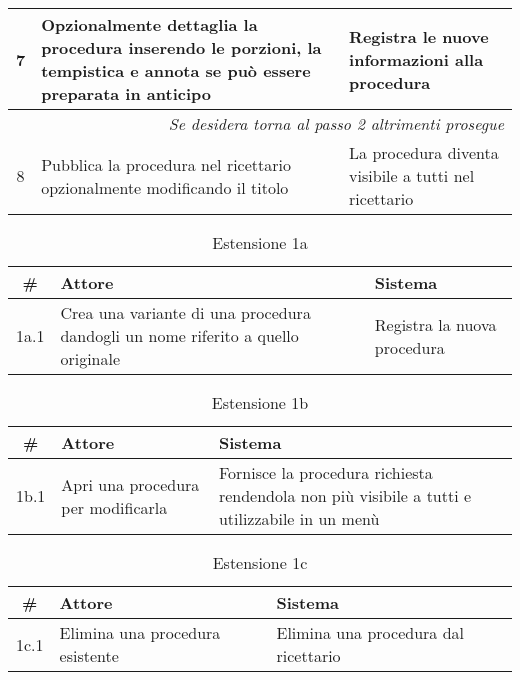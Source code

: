 \begin{tabular}{|c|p{7cm}|p{6.5cm}|}
      7                  & Opzionalmente dettaglia la procedura inserendo le porzioni, la tempistica e annota se può essere preparata in anticipo           & Registra le nuove informazioni alla procedura             \\\hline
      \multicolumn{3}{|r|}{\textit{Se desidera torna al passo 2 altrimenti prosegue}}                                                                                                                                   \\\hline
      8                  & Pubblica la procedura nel ricettario opzionalmente modificando il titolo                                                         & La procedura diventa visibile a tutti nel ricettario      \\\hline
\end{tabular}

\begin{table}[H]\caption*{Estensione 1a}
      \small
      \begin{tabular}{|c|p{7cm}|p{6.23cm}|}
            \hline\bfseries \# & \bfseries Attore                                                                & \bfseries Sistema           \\\hline
            1a.1               & Crea una variante di una procedura dandogli un nome riferito a quello originale & Registra la nuova procedura \\\hline
      \end{tabular}
\end{table}

\begin{table}[H]\caption*{Estensione 1b}
      \small
      \begin{tabular}{|c|p{7cm}|p{6.23cm}|}
            \hline\bfseries \# & \bfseries Attore                   & \bfseries Sistema                                                                             \\\hline
            1b.1               & Apri una procedura per modificarla & Fornisce la procedura richiesta rendendola non più visibile a tutti e utilizzabile in un menù \\\hline
      \end{tabular}
\end{table}

\begin{table}[H]\caption*{Estensione 1c}
      \small
      \begin{tabular}{|c|p{7cm}|p{6.24cm}|}
            \hline\bfseries \# & \bfseries Attore                & \bfseries Sistema                    \\\hline
            1c.1               & Elimina una procedura esistente & Elimina una procedura dal ricettario \\\hline
      \end{tabular}
\end{table}

